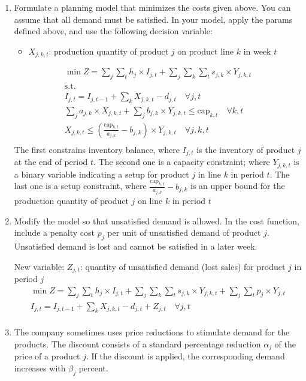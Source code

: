 \documentclass[10pt]{article}
\begin{document}
\begin{enumerate}
    \item Formulate a planning model that minimizes the costs given above. You can assume that all demand must be satisfied. In your model, apply the params defined above, and use the following decision variable: 
    \begin{itemize}
        \item $X_{j, k, t} $: production quantity of product $j $ on product line $k $ in week $t $
    \end{itemize}
    \begin{gather*}
        \min Z = \sum_j\sum_t h_j\times I_{j, t} + \sum_j\sum_k\sum_t s_{j, k}\times Y_{j, k, t}\\
        \text{s.t.}\\
        I_{j, t} = I_{j, t - 1} + \sum_k X_{j, k, t} - d_{j, t}\quad\forall j, t\\
        \sum_j a_{j, k} \times X_{j, k, t} + \sum_j b_{j, k}\times Y_{j, k ,t}\le \text{cap}_{k, t}\quad\forall k, t\\
        X_{j, k, t} \le \left(\frac{\text{cap}_{k, t}}{a_{j, k}} - b_{j, k}\right)\times Y_{j, k, t} \quad\forall j, k, t \\
    \end{gather*}
    The first constrains inventory balance, where $I_{j, t} $ is the inventory of product $j $ at the end of period $t $. The second one is a capacity constraint; where $Y_{j, k, t} $ is a binary variable indicating a setup for product $j $ in line $k $ in period $t $. The last one is a setup constraint, where $\frac{\text{cap}_{k, t}}{a_{j, k}} - b_{j, k} $ is an upper bound for the production quantity of product $j $ on line $k $ in period $ t $
    \newpage 
    \item Modify the model so that unsatisfied demand is allowed. In the cost function, include a penalty cost $p_j $ per unit of unsatisfied demand of product $j $. Unsatisfied demand is lost and cannot be satisfied in a later week.

    New variable: $Z_{j, t} $: quantity of unsatisfied demand (lost sales) for product $ j $ in period $j $
    \begin{gather*}
        \min Z = \sum_j\sum_t h_j\times I_{j, t} + \sum_j\sum_k\sum_t s_{j, k}\times Y_{j, k, t} + \sum_j\sum_t p_j\times Y_{j, t}\\
        I_{j, t} = I_{j, t - 1} + \sum_k X_{j, k, t} - d_{j, t} + Z_{j, t}\quad\forall j, t\\
    \end{gather*}
    \item The company sometimes uses price reductions to stimulate demand for the products. The discount consists of a standard percentage reduction $\alpha_j $ of the price of a product $j $. If the discount is applied, the corresponding demand increases with $\beta_j $ percent. 


\end{enumerate}
\end{document}
